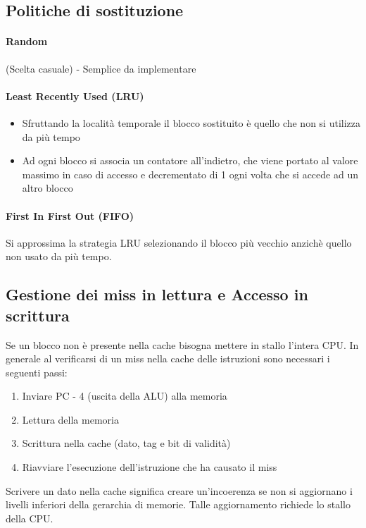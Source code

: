 \documentclass[12pt, a4paper, openany]{book}
\begin{document}
\subsection*{Politiche di sostituzione}
\paragraph{Random} (Scelta casuale) - Semplice da implementare
\paragraph{Least Recently Used (LRU)}
\begin{itemize}
    \item Sfruttando la località temporale il blocco sostituito è quello che non si
    utilizza da più tempo
    \item Ad ogni blocco si associa un contatore all'indietro, che viene portato al valore
    massimo in caso di accesso e decrementato di 1 ogni volta che si accede ad un altro blocco
\end{itemize}
\paragraph{First In First Out (FIFO)} Si approssima la strategia LRU selezionando il blocco
più vecchio anzichè quello non usato da più tempo.

\subsection{Gestione dei miss in lettura e Accesso in scrittura}
Se un blocco non è presente nella cache bisogna mettere in stallo l'intera CPU. In generale
al verificarsi di un miss nella cache delle istruzioni sono necessari i seguenti passi:
\begin{enumerate}
    \item Inviare PC - 4 (uscita della ALU) alla memoria
    \item Lettura della memoria
    \item Scrittura nella cache (dato, tag e bit di validità)
    \item Riavviare l'esecuzione dell'istruzione che ha causato il miss
\end{enumerate}

Scrivere un dato nella cache significa creare un'incoerenza se non si aggiornano i livelli
inferiori della gerarchia di memorie.
Talle aggiornamento richiede lo stallo della CPU.
\end{document}
